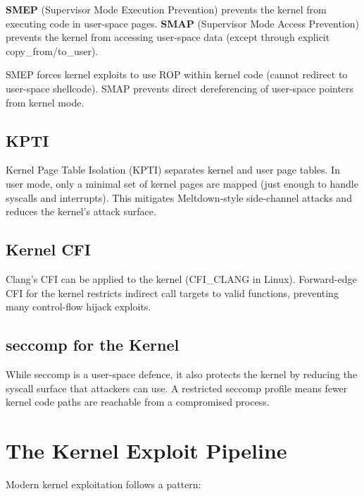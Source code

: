 \begin{definition}
	\textbf{SMEP} (Supervisor Mode Execution Prevention) prevents the kernel from executing code in user-space pages. \textbf{SMAP} (Supervisor Mode Access Prevention) prevents the kernel from accessing user-space data (except through explicit copy\_from/to\_user).
\end{definition}

SMEP forces kernel exploits to use ROP within kernel code (cannot redirect to user-space shellcode). SMAP prevents direct dereferencing of user-space pointers from kernel mode.

\subsection{KPTI}

Kernel Page Table Isolation (KPTI) separates kernel and user page tables. In user mode, only a minimal set of kernel pages are mapped (just enough to handle syscalls and interrupts). This mitigates Meltdown-style side-channel attacks and reduces the kernel's attack surface.

\subsection{Kernel CFI}

Clang's CFI can be applied to the kernel (CFI\_CLANG in Linux). Forward-edge CFI for the kernel restricts indirect call targets to valid functions, preventing many control-flow hijack exploits.

\subsection{seccomp for the Kernel}

While seccomp is a user-space defence, it also protects the kernel by reducing the syscall surface that attackers can use. A restricted seccomp profile means fewer kernel code paths are reachable from a compromised process.

\section{The Kernel Exploit Pipeline}

Modern kernel exploitation follows a pattern:

